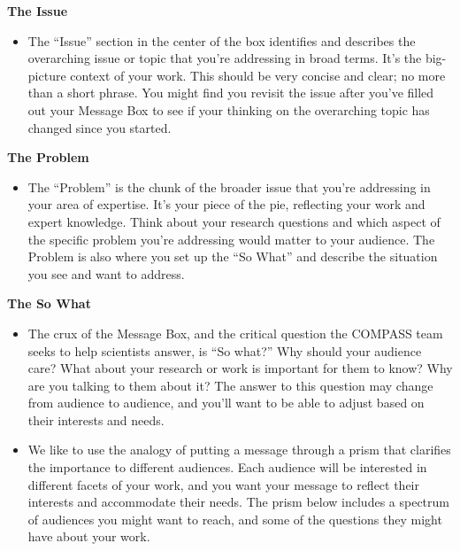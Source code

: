 \documentclass[
]{book}
\providecommand{\tightlist}{%
  \setlength{\itemsep}{0pt}\setlength{\parskip}{0pt}}
\begin{document}
\textbf{The Issue}

\begin{itemize}
\tightlist
\item
  The ``Issue'' section in the center of the box identifies and describes the overarching issue or topic that you're addressing in broad terms. It's the big-picture context of your work. This should be very concise and clear; no more than a short phrase. You might find you revisit the issue after you've filled out your Message Box to see if your thinking on the overarching topic has changed since you started.
\end{itemize}

\textbf{The Problem}

\begin{itemize}
\tightlist
\item
  The ``Problem'' is the chunk of the broader issue that you're addressing in your area of expertise. It's your piece of the pie, reflecting your work and expert knowledge. Think about your research questions and which aspect of the specific problem you're addressing would matter to your audience. The Problem is also where you set up the ``So What'' and describe the situation you see and want to address.
\end{itemize}

\textbf{The So What}

\begin{itemize}
\item
  The crux of the Message Box, and the critical question the COMPASS team seeks to help scientists answer, is ``So what?'' Why should your audience care? What about your research or work is important for them to know? Why are you talking to them about it? The answer to this question may change from audience to audience, and you'll want to be able to adjust based on their interests and needs.
\item
  We like to use the analogy of putting a message through a prism that clarifies the importance to different audiences. Each audience will be interested in different facets of your work, and you want your message to reflect their interests and accommodate their needs. The prism below includes a spectrum of audiences you might want to reach, and some of the questions they might have about your work.
\end{itemize}
\end{document}

